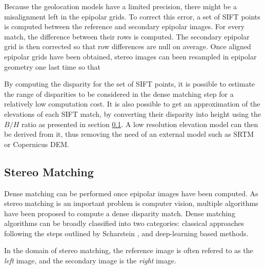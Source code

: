 Because the geolocation models have a limited precision, there might be a misalignment left in the epipolar grids. To correct this error, a set of SIFT points \cite{lowe_distinctive_2004} is computed between the reference and secondary epipolar images. For every match, the difference between their rows is computed. The secondary epipolar grid is then corrected so that row differences are null on average. Once aligned epipolar grids have been obtained, stereo images can been resampled in epipolar geometry one last time so that 

\begin{remark}
    By computing the disparity for the set of SIFT points, it is possible to estimate the range of disparities to be considered in the dense matching step for a relatively low computation cost. It is also possible to get an approximation of the elevations of each SIFT match, by converting their disparity into height using the $B/H$ ratio as presented in section \ref{sec:stereo_matching}. A low resolution elevation model can then be derived from it, thus removing the need of an external model such as SRTM or Copernicus DEM.
\end{remark} 

\subsection{Stereo Matching}\label{sec:stereo_matching}
Dense matching can be performed once epipolar images have been computed. As stereo matching is an important problem is computer vision, multiple algorithms have been proposed to compute a dense disparity match. Dense matching algorithms can be broadly classified into two categories: classical approaches following the steps outlined by Scharstein \etal \cite{scharstein_taxonomy_2001}, and deep-learning based methods.

\begin{remark}
	In the domain of stereo matching, the reference image is often refered to as the \textit{left} image, and the secondary image is the \textit{right} image.
\end{remark}


